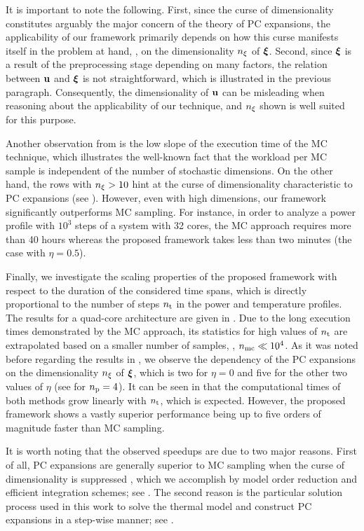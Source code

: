 It is important to note the following.
First, since the curse of dimensionality constitutes arguably the major concern of the theory of PC expansions, the applicability of our framework primarily depends on how this curse manifests itself in the problem at hand, \ie, on the dimensionality ${n_\xi}$ of $\boldsymbol{\xi}$.
Second, since $\boldsymbol{\xi}$ is a result of the preprocessing stage depending on many factors, the relation between $\mathbf{u}$ and $\boldsymbol{\xi}$ is not straightforward, which is illustrated in the previous paragraph.
Consequently, the dimensionality of $\mathbf{u}$ can be misleading when reasoning about the applicability of our technique, and ${n_\xi}$ shown  is well suited for this purpose.

Another observation from  is the low slope of the execution time of the MC technique, which illustrates the well-known fact that the workload per MC sample is independent of the number of stochastic dimensions.
On the other hand, the rows with ${n_\xi} > 10$ hint at the curse of dimensionality characteristic to PC expansions (see ).
However, even with high dimensions, our framework significantly outperforms MC sampling. For instance, in order to analyze a power profile with $10^3$ steps of a system with 32 cores, the MC approach requires more than 40 hours whereas the proposed framework takes less than two minutes (the case with $\eta = 0.5$).

Finally, we investigate the scaling properties of the proposed framework with respect to the duration of the considered time spans, which is directly proportional to the number of steps ${n_\text{t}}$ in the power and temperature profiles.
The results for a quad-core architecture are given in .
Due to the long execution times demonstrated by the MC approach, its statistics for high values of ${n_\text{t}}$ are extrapolated based on a smaller number of samples, \ie, ${n_\text{mc}} \ll 10^4$.
As it was noted before regarding the results in , we observe the dependency of the PC expansions on the dimensionality ${n_\xi}$ of $\boldsymbol{\xi}$, which is two for $\eta = 0$ and five for the other two values of $\eta$ (see  for ${n_\text{p}} = 4$).
It can be seen in  that the computational times of both methods grow linearly with ${n_\text{t}}$, which is expected.
However, the proposed framework shows a vastly superior performance being up to five orders of magnitude faster than MC sampling.

It is worth noting that the observed speedups are due to two major reasons.
First of all, PC expansions are generally superior to MC sampling when the curse of dimensionality is suppressed \cite{xiu2010, eldred2008}, which we accomplish by model order reduction and efficient integration schemes; see .
The second reason is the particular solution process used in this work to solve the thermal model and construct PC expansions in a step-wise manner; see .
